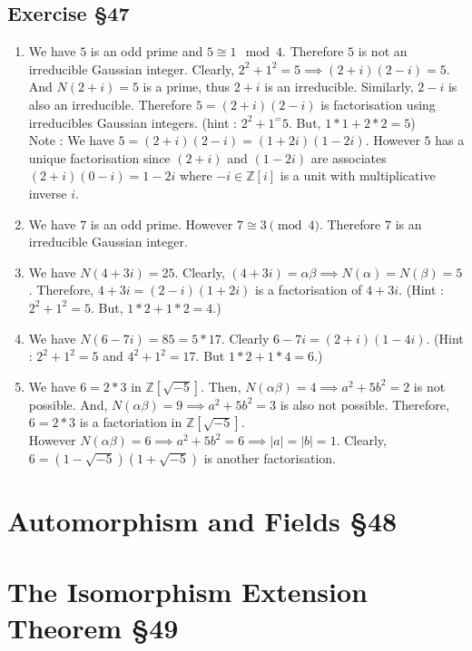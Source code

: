 \subsection{Exercise \S47}
\begin{enumerate}
	\item We have $5$ is an odd prime and  $5 \cong 1 \mod{4}$.
		Therefore $5$ is not an irreducible Gaussian integer.
		Clearly, $2^2+1^2 = 5 \implies (2+i)(2-i) = 5$.\\

		And $N(2+i) = 5$ is a prime, thus $2+i$ is an irreducible.
		Similarly, $2-i$ is also an irreducible.
		Therefore $5 = (2+i)(2-i)$ is factorisation using irreducibles Gaussian integers.
		(hint : $2^2+1^ = 5$. But, $1 \ast 1 + 2 \ast 2 = 5$)\\

		Note : We have $ 5 = (2+i)(2-i) = (1+2i)(1-2i)$.
		However $5$ has a unique factorisation since $(2+i)$ and $(1-2i)$ are associates $(2+i)(0-i) = 1-2i$ where $-i \in \mathbb{Z}[i]$ is a unit with multiplicative inverse $i$.

	\item We have $7$ is an odd prime.
		However $7 \cong 3 \pmod{4}$.
		Therefore $7$ is an irreducible Gaussian integer.
	\item We have $N(4+3i) = 25$.
		Clearly, $(4+3i) = \alpha\beta \implies N(\alpha) = N(\beta) = 5$.
		Therefore, $4+3i = (2-i)(1+2i)$ is a factorisation of $4+3i$.
		(Hint : $2^2+1^2 = 5$. But, $1 \ast 2 + 1 \ast 2 = 4$.)
	\item We have $N(6-7i) = 85 = 5 \ast 17$.
		Clearly $6-7i = (2+i)(1-4i)$.
		(Hint : $2^2+1^2 = 5$ and $4^2+1^2 = 17$. But $1 \ast 2 + 1 \ast 4 = 6$.)
	\item We have $6 = 2 \ast 3$ in $\mathbb{Z}[\sqrt{-5}]$.
		Then, $N(\alpha\beta) = 4 \implies a^2+5b^2 = 2$ is not possible.
		And, $N(\alpha\beta)= 9 \implies a^2+5b^2 = 3$ is also not possible. Therefore, $6 = 2 \ast 3$ is a factoriation in $\mathbb{Z}[\sqrt{-5}]$.\\

		However $N(\alpha\beta) = 6 \implies a^2 + 5b^2 = 6 \implies |a| = |b| = 1$.
		Clearly, $6 = (1-\sqrt{-5})(1+\sqrt{-5})$ is another factorisation.
\end{enumerate}
\section{Automorphism and Fields \S48}
\section{The Isomorphism Extension Theorem \S49}
